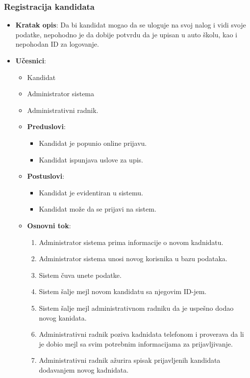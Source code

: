 \subsubsection{Registracija kandidata}
\label{subsubsec:registracija}
\begin{itemize}
  \item \textbf{Kratak opis}: Da bi kandidat mogao da se uloguje na svoj nalog i vidi svoje podatke, nepohodno je da dobije potvrdu da je upisan u auto školu, kao i nepohodan ID za logovanje.
  \item \textbf{Učesnici}:
  \begin{itemize}
    \item Kandidat
    \item Administrator sistema
    \item Administrativni radnik.
  \item \textbf{Preduslovi}:
    \begin{itemize}
    \item  Kandidat je popunio online prijavu.
    \item  Kandidat ispunjava uslove za upis.
    \end{itemize}
  \item \textbf{Postuslovi}:
      \begin{itemize}
      \item Kandidat je evidentiran u sistemu.
      \item Kandidat može da se prijavi na sistem.
      \end{itemize}
  \item \textbf{Osnovni tok}:
      \begin{enumerate}
        \item Administrator sistema prima informacije o novom kadnidatu.
        \item Administrator sistema unosi novog korisnika u bazu podataka.
        \item Sistem čuva unete podatke.
        \item Sistem šalje mejl novom kandidatu sa njegovim ID-jem.
        \item Sistem šalje mejl administrativnom radniku da je uspešno dodao novog kanidata.
        \item Administrativni radnik poziva kadnidata telefonom i proverava da li je dobio mejl sa svim potrebnim informacijama za prijavljivanje.
        \item Administrativni radnik ažurira spisak prijavljenih kandidata dodavanjem novog kadnidata.    
      \end{enumerate}


\end{itemize}
\end{itemize}
